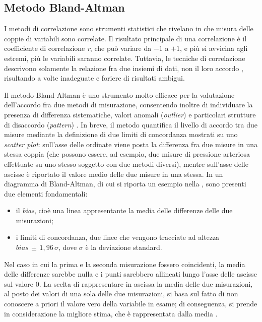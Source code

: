 \subsection{Metodo Bland-Altman}\label{blandaltman}
I metodi di correlazione sono strumenti statistici che rivelano in che misura delle coppie di variabili sono correlate. Il risultato principale di una correlazione è il coefficiente di correlazione \textit{r}, che può variare da $-1$ a $+1$, e più si avvicina agli estremi, più le variabili saranno correlate. Tuttavia, le tecniche di correlazione descrivono solamente la relazione fra due insiemi di dati, non il loro accordo \cite{Udovicic2007,Giavarina2015}, risultando a volte inadeguate e foriere di risultati ambigui.

Il metodo Bland-Altman è uno strumento molto efficace per la valutazione dell'accordo fra due metodi di misurazione, consentendo inoltre di individuare la presenza di differenza sistematiche, valori anomali (\textit{outlier}) e particolari strutture di disaccordo (\textit{pattern}) \cite[357]{szklo,Franco2017}. In breve, il metodo quantifica il livello di accordo tra due misure mediante la definizione di due limiti di concordanza mostrati su uno \textit{scatter plot}: sull'asse delle ordinate viene posta la differenza fra due misure in una stessa coppia (che possono essere, ad esempio, due misure di pressione arteriosa effettuate su uno stesso soggetto con due metodi diversi), mentre sull'asse delle ascisse è riportato il valore medio delle due misure in una stessa. In un diagramma di Bland-Altman, di cui si riporta un esempio nella , sono presenti due elementi fondamentali:
\begin{itemize}[label=$-$]
    \item il \textit{bias}, cioè una linea appresentante la media delle differenze delle due misurazioni;
    \item i limiti di concordanza, due linee che vengono tracciate ad altezza $bias\,\pm\,1,96\,\sigma$, dove $\sigma$ è la deviazione standard.
\end{itemize}

Nel caso in cui la prima e la seconda misurazione fossero coincidenti, la media delle differenze sarebbe nulla e i punti sarebbero allineati lungo l’asse delle ascisse sul valore 0. La scelta di rappresentare in ascissa la media delle due misurazioni, al posto dei valori di una sola delle due misurazioni, si basa sul fatto di non conoscere a priori il valore vero della variabile in
esame; di conseguenza, si prende in considerazione la migliore stima, che è rappresentata dalla media \cite{Franco2017}.

